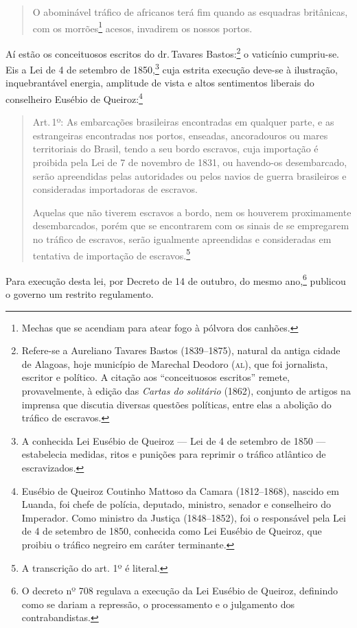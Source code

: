 {\begin{quote}
O abominável tráfico de africanos terá fim quando as esquadras
britânicas, com os morrões\footnote{Mechas que se acendiam para atear
  fogo à pólvora dos canhões.} acesos, invadirem os nossos portos.
\end{quote}

Aí estão os conceituosos escritos do dr.\,Tavares Bastos:\footnote{
  Refere-se a Aureliano Tavares Bastos (1839--1875), natural da antiga
  cidade de Alagoas, hoje município de Marechal Deodoro (\textsc{al}), que foi
  jornalista, escritor e político. A citação aos ``conceituosos escritos''
  remete, provavelmente, à edição das \emph{Cartas do solitário} (1862),
  conjunto de artigos na imprensa que discutia diversas questões
  políticas, entre elas a abolição do tráfico de escravos.} o vaticínio
cumpriu-se. Eis a Lei de 4 de setembro de 1850,\footnote{A conhecida
  Lei Eusébio de Queiroz --- Lei de 4 de setembro de 1850 --- estabelecia
  medidas, ritos e punições para reprimir o tráfico atlântico de
  escravizados.} cuja estrita execução deve-se à ilustração,
inquebrantável energia, amplitude de vista e altos sentimentos liberais
do conselheiro Eusébio de Queiroz:\footnote{Eusébio de Queiroz \label{eusebio}
  Coutinho Mattoso da Camara (1812--1868), nascido em
  Luanda, foi chefe de polícia, deputado, ministro, senador e
  conselheiro do Imperador. Como ministro da Justiça (1848--1852), foi o
  responsável pela Lei de 4 de setembro de 1850, conhecida como Lei
  Eusébio de Queiroz, que proibiu o tráfico negreiro em caráter
  terminante.}

\begin{quote}
Art.\,1º: As embarcações brasileiras encontradas em qualquer parte, e as
estrangeiras encontradas nos portos, enseadas, ancoradouros ou mares
territoriais do Brasil, tendo a seu bordo escravos, cuja importação é
proibida pela Lei de 7 de novembro de 1831, ou havendo-os desembarcado,
serão apreendidas pelas autoridades ou pelos navios de guerra
brasileiros e consideradas importadoras de escravos.

Aquelas que não tiverem escravos a bordo, nem os houverem proximamente
desembarcados, porém que se encontrarem com os sinais de se empregarem
no tráfico de escravos, serão igualmente apreendidas e consideradas em
tentativa de importação de escravos.\footnote{A transcrição do art.
  1º é literal.}
\end{quote}  

Para execução desta lei, por Decreto de 14 de outubro, do mesmo
ano,\footnote{O decreto nº 708 regulava a execução da Lei Eusébio de
  Queiroz, definindo como se dariam a repressão, o processamento e o
  julgamento dos contrabandistas.} publicou o governo um restrito
regulamento.

}
